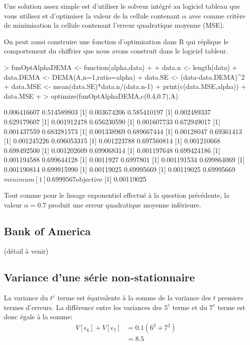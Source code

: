\documentclass{article}
\begin{document}
Une solution assez simple est d'utiliser le solveur intégré au logiciel tableau que vous utilisez et d'optimiser la valeur de la cellule contenant $\alpha$ avec comme critère de minimisation la cellule contenant l'erreur quadratique moyenne (MSE).

On peut aussi construire une fonction d'optimisation dans R qui réplique le comportement du chiffrier que nous avons construit dans le logiciel tableur.

\begin{Schunk}
\begin{Sinput}
> funOptAlphaDEMA <- function(alpha,data)
+   {
+     data.n <- length(data)
+     data.DEMA <- DEMA(A,n=1,ratio=alpha)
+     data.SE <- (data-data.DEMA)^2
+     data.MSE <- mean(data.SE)*data.n/(data.n-1)
+     print(c(data.MSE,alpha))
+     data.MSE
+   }
> optimize(funOptAlphaDEMA,c(0.4,0.7),A)
\end{Sinput}
\begin{Soutput}
[1] 0.006416607 0.514589803
[1] 0.003674206 0.585410197
[1] 0.002489337 0.629179607
[1] 0.001912478 0.656230590
[1] 0.001607733 0.672949017
[1] 0.001437559 0.683281573
[1] 0.001338969 0.689667444
[1] 0.00128047 0.69361413
[1] 0.001245226 0.696053315
[1] 0.001223788 0.697560814
[1] 0.001210668 0.698492500
[1] 0.001202609 0.699068314
[1] 0.001197648 0.699424186
[1] 0.001194588 0.699644128
[1] 0.0011927 0.6997801
[1] 0.001191534 0.699864069
[1] 0.001190814 0.699915990
[1] 0.00119025 0.69995669
[1] 0.00119025 0.69995669
$minimum
[1] 0.6999567

$objective
[1] 0.00119025
\end{Soutput}
\end{Schunk}

Tout comme pour le lissage exponentiel effectué à la question précédente, la valeur $\alpha=0.7$ produit une erreur quadratique moyenne inférieure.
\subsection{Bank of America}

(détail à venir)

\subsection{Variance d'une série non-stationnaire}

La variance du $t^e$ terme est équivalente à la somme de la variance des $t$ premiers termes d'erreurs. La différence entre les variances des $5^e$ terme et du $7^e$ terme est donc égale à la somme:
\begin{align*}
  \label{eq:2}
  V\left[\epsilon_6\right]+V\left[\epsilon_7\right] &= 0.1(6^2+7^2) \\
  & = 8.5
\end{align*}
\end{document}
